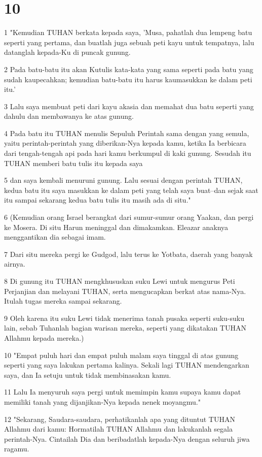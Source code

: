 \chapter{10}

\par 1 "Kemudian TUHAN berkata kepada saya, 'Musa, pahatlah dua lempeng batu seperti yang pertama, dan buatlah juga sebuah peti kayu untuk tempatnya, lalu datanglah kepada-Ku di puncak gunung.
\par 2 Pada batu-batu itu akan Kutulis kata-kata yang sama seperti pada batu yang sudah kaupecahkan; kemudian batu-batu itu harus kaumasukkan ke dalam peti itu.'
\par 3 Lalu saya membuat peti dari kayu akasia dan memahat dua batu seperti yang dahulu dan membawanya ke atas gunung.
\par 4 Pada batu itu TUHAN menulis Sepuluh Perintah sama dengan yang semula, yaitu perintah-perintah yang diberikan-Nya kepada kamu, ketika Ia berbicara dari tengah-tengah api pada hari kamu berkumpul di kaki gunung. Sesudah itu TUHAN memberi batu tulis itu kepada saya
\par 5 dan saya kembali menuruni gunung. Lalu sesuai dengan perintah TUHAN, kedua batu itu saya masukkan ke dalam peti yang telah saya buat--dan sejak saat itu sampai sekarang kedua batu tulis itu masih ada di situ."
\par 6 (Kemudian orang Israel berangkat dari sumur-sumur orang Yaakan, dan pergi ke Mosera. Di situ Harun meninggal dan dimakamkan. Eleazar anaknya menggantikan dia sebagai imam.
\par 7 Dari situ mereka pergi ke Gudgod, lalu terus ke Yotbata, daerah yang banyak airnya.
\par 8 Di gunung itu TUHAN mengkhususkan suku Lewi untuk mengurus Peti Perjanjian dan melayani TUHAN, serta mengucapkan berkat atas nama-Nya. Itulah tugas mereka sampai sekarang.
\par 9 Oleh karena itu suku Lewi tidak menerima tanah pusaka seperti suku-suku lain, sebab Tuhanlah bagian warisan mereka, seperti yang dikatakan TUHAN Allahmu kepada mereka.)
\par 10 "Empat puluh hari dan empat puluh malam saya tinggal di atas gunung seperti yang saya lakukan pertama kalinya. Sekali lagi TUHAN mendengarkan saya, dan Ia setuju untuk tidak membinasakan kamu.
\par 11 Lalu Ia menyuruh saya pergi untuk memimpin kamu supaya kamu dapat memiliki tanah yang dijanjikan-Nya kepada nenek moyangmu."
\par 12 "Sekarang, Saudara-saudara, perhatikanlah apa yang dituntut TUHAN Allahmu dari kamu: Hormatilah TUHAN Allahmu dan lakukanlah segala perintah-Nya. Cintailah Dia dan beribadatlah kepada-Nya dengan seluruh jiwa ragamu.
